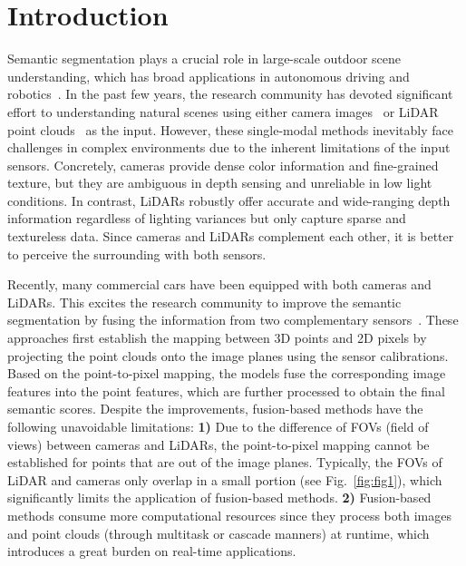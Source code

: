 \documentclass[runningheads]{llncs}
\begin{document}
	
	\section{Introduction}
	
	Semantic segmentation plays a crucial role in large-scale outdoor scene understanding, which has broad applications in autonomous driving and robotics~\cite{hu2019randla,yan2021sparse,SparseConv}.
In the past few years, the research community has devoted significant effort to understanding natural scenes using either camera images~\cite{chen2017deeplab,chen2017rethinking,song2017semantic,huang2019ccnet} or LiDAR point clouds~\cite{yan2021sparse,xu2020squeezesegv3,zhu2021cylindrical,tang2020searching,zheng2022beyond,zheng2021box} as the input.
However, these single-modal methods inevitably face challenges in complex environments due to the inherent limitations of the input sensors.
Concretely, cameras provide dense color information and fine-grained texture, but they are ambiguous in depth sensing and unreliable in low light conditions. In contrast, LiDARs robustly offer accurate and wide-ranging depth information regardless of lighting variances but only capture sparse and textureless data.
Since cameras and LiDARs complement each other, it is better to perceive the surrounding with both sensors.
	
	Recently, many commercial cars have been equipped with both cameras and LiDARs. This excites the research community to improve the semantic segmentation by fusing the information from two complementary sensors~\cite{zhuang2021perception,el2019rgb,vora2020pointpainting}.
These approaches first establish the mapping between 3D points and 2D pixels by projecting the point clouds onto the image planes using the sensor calibrations.
Based on the point-to-pixel mapping, the models fuse the corresponding image features into the point features, which are further processed to obtain the final semantic scores. 
Despite the improvements, fusion-based methods have the following unavoidable limitations:
	\textbf{1)} Due to the difference of FOVs (field of views) between cameras and LiDARs, the point-to-pixel mapping cannot be established for points that are out of the image planes. Typically, the FOVs of LiDAR and cameras only overlap in a small portion (see {Fig.~\ref{fig:fig1}}), which significantly limits the application of fusion-based methods.
	\textbf{2)} Fusion-based methods consume more computational resources since they process both images and point clouds (through multitask or cascade manners) at runtime, which introduces a great burden on real-time applications.
	
\end{document}
